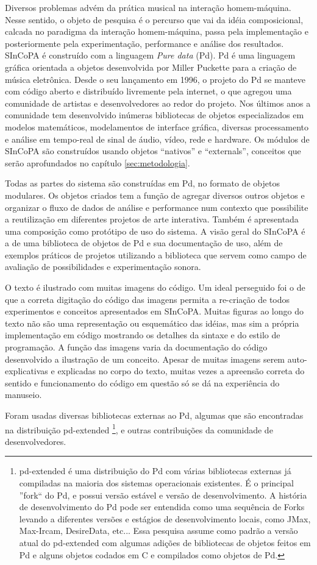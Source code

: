 \documentclass[draft]{ppgmus}
\newcommand{\pd}{Pd}
\begin{document}
Diversos problemas advém da prática
musical na interação homem-máquina. Nesse sentido, o 
objeto de pesquisa é o percurso que vai da idéia composicional, calcada
no paradigma da interação homem-máquina,  passa pela implementação
e posteriormente pela experimentação, performance e análise dos resultados.
SInCoPA é construído com a linguagem \textit{Pure data} (\pd). 
Pd \cite{pd:96} é uma linguagem gráfica orientada a objetos desenvolvida por Miller Puckette
para a criação de música eletrônica. Desde o seu lançamento em 1996, o projeto do Pd se manteve
com código aberto e distribuído livremente pela internet, o que agregou uma comunidade de 
artistas e desenvolvedores ao redor do projeto.
Nos últimos anos a comunidade tem desenvolvido inúmeras bibliotecas de objetos especializados em modelos matemáticos, modelamentos de interface gráfica, diversas 
processamento e análise em tempo-real de sinal de áudio, vídeo, rede e hardware. 
Os módulos de SInCoPA são construídos usando objetos ``nativos'' e ``externals'', 
conceitos que serão aprofundados no capítulo \ref{sec:metodologia}. 

Todas as partes do sistema são construídas em Pd, no formato de objetos
modulares. Os objetos criados tem a função de agregar diversos outros objetos e organizar o fluxo de dados
de análise e performance num contexto que possibilite a reutilização em diferentes projetos de arte interativa.
Também é apresentada uma composição como protótipo de uso do sistema. A visão geral do
SInCoPA é a de uma biblioteca de objetos de Pd e sua documentação de uso, 
além de exemplos práticos de projetos
utilizando a biblioteca que servem como campo de avaliação de possibilidades e experimentação sonora.


O texto é ilustrado com muitas imagens do código. Um ideal perseguido foi o de que a correta
digitação do código das imagens permita a re-criação de todos experimentos e conceitos apresentados
em SInCoPA. Muitas figuras ao longo do texto não são uma representação ou esquemático das idéias, mas sim a própria
implementação em código mostrando os detalhes da sintaxe e do estilo de programação.
A função das imagens varia da documentação do código desenvolvido a ilustração de um conceito.
Apesar de muitas imagens serem auto-explicativas e explicadas no corpo do texto, muitas vezes a apreensão 
correta do sentido e funcionamento do código em questão só se dá na experiência do manuseio. 


Foram usadas diversas bibliotecas externas ao Pd, algumas que são encontradas na distribuição pd-extended
\footnote{pd-extended é uma distribuição do Pd com várias bibliotecas externas já compiladas na maioria dos
sistemas operacionais existentes. É o principal ''fork`` do Pd, e possui versão estável e versão de desenvolvimento.
A história de desenvolvimento do Pd pode ser entendida como uma sequência de Forks levando a diferentes versões 
e estágios de desenvolvimento locais, como JMax, Max-Ircam, DesireData, etc... Essa pesquisa assume como padrão
a versão atual do pd-extended com algumas adições de bibliotecas de objetos feitos em Pd e alguns objetos codados
em C e compilados como objetos de Pd.}, 
e outras contribuições da comunidade de desenvolvedores.
\end{document}
